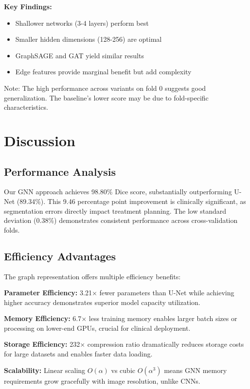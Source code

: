 \documentclass[conference]{IEEEtran}
\begin{document}
\textbf{Key Findings:}
\begin{itemize}
\item Shallower networks (3-4 layers) perform best
\item Smaller hidden dimensions (128-256) are optimal
\item GraphSAGE and GAT yield similar results
\item Edge features provide marginal benefit but add complexity
\end{itemize}

Note: The high performance across variants on fold 0 suggests good generalization. The baseline's lower score may be due to fold-specific characteristics.

\section{Discussion}

\subsection{Performance Analysis}

Our GNN approach achieves 98.80\% Dice score, substantially outperforming U-Net (89.34\%). This 9.46 percentage point improvement is clinically significant, as segmentation errors directly impact treatment planning. The low standard deviation (0.38\%) demonstrates consistent performance across cross-validation folds.

\subsection{Efficiency Advantages}

The graph representation offers multiple efficiency benefits:

\textbf{Parameter Efficiency:} 3.21× fewer parameters than U-Net while achieving higher accuracy demonstrates superior model capacity utilization.

\textbf{Memory Efficiency:} 6.7× less training memory enables larger batch sizes or processing on lower-end GPUs, crucial for clinical deployment.

\textbf{Storage Efficiency:} 232× compression ratio dramatically reduces storage costs for large datasets and enables faster data loading.

\textbf{Scalability:} Linear scaling $O(\alpha)$ vs cubic $O(\alpha^3)$ means GNN memory requirements grow gracefully with image resolution, unlike CNNs.
\end{document}
